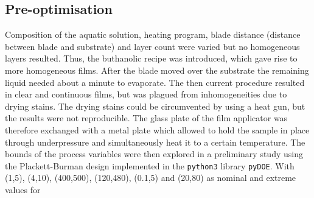 \subsection{Pre-optimisation}\label{sec:exp-preopt}
Composition of the aquatic solution, heating program, blade distance (distance between 
blade and substrate) and layer count were varied but no homogeneous layers resulted. 
Thus, 
the buthanolic recipe was introduced, which gave rise to more homogeneous films.
After the blade moved over the substrate the remaining liquid needed about a minute 
to evaporate. 
The then current procedure resulted in clear and continuous films, but was plagued from 
inhomogeneities due to drying stains. 
The drying stains could be circumvented by using a heat gun, but the results were not 
reproducible. 
The glass plate of the film applicator was therefore exchanged with a metal plate which 
allowed to hold the sample in place through underpressure and simultaneously heat it to a certain 
temperature. The bounds of the process variables were then explored in a preliminary study 
using the Plackett-Burman \cite{Plackett1946} design implemented in the \texttt{python3} 
library \texttt{pyDOE}. With 
(1,5), (4,10), (400,500), (120,480), (0.1,5) and  (20,80) 
as nominal and extreme values for 
